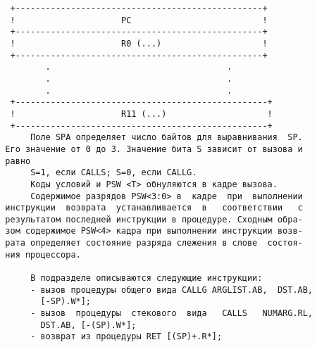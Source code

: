 \begin{verbatim}
   +-------------------------------------------------+
   !                     PC                          !
   +-------------------------------------------------+
   !                     R0 (...)                    !
   +-------------------------------------------------+
          .                                   .
          .                                   .
          .                                   .
   +--------------------------------------------------+
   !                     R11 (...)                    !
   +--------------------------------------------------+
       Поле SPA определяет число байтов для выравнивания  SP.
  Его значение от 0 до 3. Значение бита S зависит от вызова и
  равно
       S=1, если CALLS; S=0, если CALLG.
       Коды условий и PSW <T> обнуляются в кадре вызова.
       Содержимое разрядов PSW<3:0> в  кадре  при  выполнении
  инструкции  возврата  устанавливается  в   соответствии   с
  результатом последней инструкции в процедуре. Сходным обра-
  зом содержимое PSW<4> кадра при выполнении инструкции возв-
  рата определяет состояние разряда слежения в слове  состоя-
  ния процессора.

       В подразделе описываются следующие инструкции:
       - вызов процедуры общего вида CALLG ARGLIST.AB,  DST.AB,
         [-SP).W*];
       - вызов  процедуры  стекового  вида   CALLS   NUMARG.RL,
         DST.AB, [-(SP).W*];
       - возврат из процедуры RET [(SP)+.R*];


\end{verbatim}
